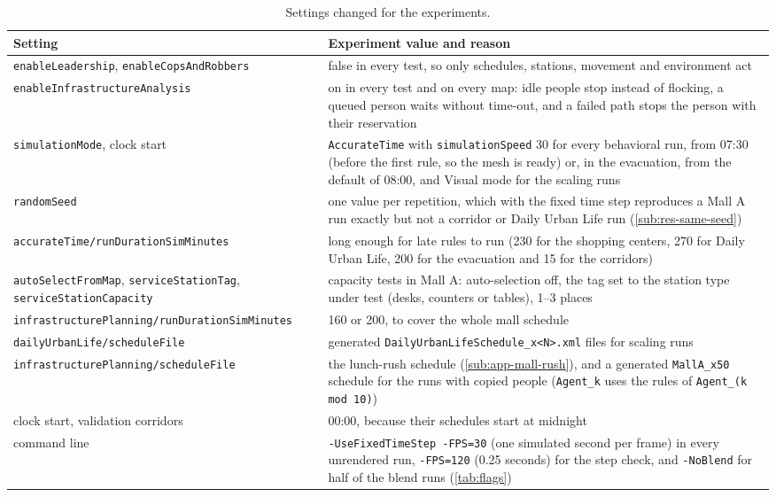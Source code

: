 \begin{table}[H]
\centering
{\small\renewcommand{\arraystretch}{1.15}
\begin{tabularx}{\textwidth}{|R{5.6cm}|Q|}
\hline
{}\textbf{Setting} & \textbf{Experiment value and reason} \\
\hline
\texttt{enableLeadership}, \texttt{enableCopsAndRobbers} & false in every test, so only schedules, stations, movement and environment act \\ \hline
\texttt{enableInfrastructure\allowbreak Analysis} & on in every test and on every map: idle people stop instead of flocking, a queued person waits without time-out, and a failed path stops the person with their reservation \\ \hline
\texttt{simulationMode}, clock start & \texttt{AccurateTime} with \texttt{simulationSpeed} 30 for every behavioral run, from 07:30 (before the first rule, so the mesh is ready) or, in the evacuation, from the default of 08:00, and Visual mode for the scaling runs \\ \hline
\texttt{randomSeed} & one value per repetition, which with the fixed time step reproduces a Mall A run exactly but not a corridor or Daily Urban Life run (\cref{sub:res-same-seed}) \\ \hline
\texttt{accurateTime/}\allowbreak\texttt{runDurationSimMinutes} & long enough for late rules to run (230 for the shopping centers, 270 for Daily Urban Life, 200 for the evacuation and 15 for the corridors) \\ \hline
\texttt{autoSelectFromMap}, \texttt{serviceStationTag}, \texttt{serviceStation}\allowbreak\texttt{Capacity} & capacity tests in Mall A: auto-selection off, the tag set to the station type under test (desks, counters or tables), 1--3 places \\ \hline
\texttt{infrastructurePlanning/}\allowbreak\texttt{runDurationSimMinutes} & 160 or 200, to cover the whole mall schedule \\ \hline
\texttt{dailyUrbanLife/}\allowbreak\texttt{scheduleFile} & generated \texttt{DailyUrbanLifeSchedule\_x<N>.xml} files for scaling runs \\ \hline
\texttt{infrastructurePlanning/}\allowbreak\texttt{scheduleFile} & the lunch-rush schedule (\cref{sub:app-mall-rush}), and a generated \texttt{MallA\_x50} schedule for the runs with copied people (\texttt{Agent\_k} uses the rules of \texttt{Agent\_(k mod 10)}) \\ \hline
clock start, validation corridors & 00:00, because their schedules start at midnight \\ \hline
command line & \texttt{-UseFixedTimeStep -FPS=30} (one simulated second per frame) in every unrendered run, \texttt{-FPS=120} (0.25 seconds) for the step check, and \texttt{-NoBlend} for half of the blend runs (\cref{tab:flags}) \\ \hline
\end{tabularx}}
\caption[Settings changed for the experiments]{Settings changed for the experiments.}
\label{tab:experiment-settings}
\end{table}

